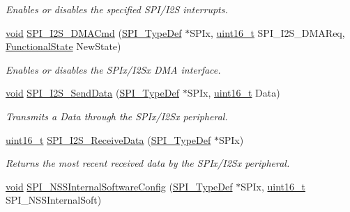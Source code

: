 \begin{DoxyCompactItemize}
\begin{DoxyCompactList}\small\item\em Enables or disables the specified S\+P\+I/\+I2S interrupts. \end{DoxyCompactList}\item 
\hyperlink{usb__devapi_8h_afabf60e7f57651d6d595a02c75f07cd0}{void} \hyperlink{group___s_p_i___private___functions_gabed5b91a8576e6d578f364cc0e807e4a}{S\+P\+I\+\_\+\+I2\+S\+\_\+\+D\+M\+A\+Cmd} (\hyperlink{struct_s_p_i___type_def}{S\+P\+I\+\_\+\+Type\+Def} $\ast$S\+P\+Ix, \hyperlink{_p_e___types_8h_a1f1825b69244eb3ad2c7165ddc99c956}{uint16\+\_\+t} S\+P\+I\+\_\+\+I2\+S\+\_\+\+D\+M\+A\+Req, \hyperlink{agilefox_2library_2inc_2stm32f10x__type_8h_ac9a7e9a35d2513ec15c3b537aaa4fba1}{Functional\+State} New\+State)
\begin{DoxyCompactList}\small\item\em Enables or disables the S\+P\+Ix/\+I2\+Sx D\+MA interface. \end{DoxyCompactList}\item 
\hyperlink{usb__devapi_8h_afabf60e7f57651d6d595a02c75f07cd0}{void} \hyperlink{group___s_p_i___private___functions_gad5af40bebe8dbe3fa8bd476489d7e3da}{S\+P\+I\+\_\+\+I2\+S\+\_\+\+Send\+Data} (\hyperlink{struct_s_p_i___type_def}{S\+P\+I\+\_\+\+Type\+Def} $\ast$S\+P\+Ix, \hyperlink{_p_e___types_8h_a1f1825b69244eb3ad2c7165ddc99c956}{uint16\+\_\+t} Data)
\begin{DoxyCompactList}\small\item\em Transmits a Data through the S\+P\+Ix/\+I2\+Sx peripheral. \end{DoxyCompactList}\item 
\hyperlink{_p_e___types_8h_a1f1825b69244eb3ad2c7165ddc99c956}{uint16\+\_\+t} \hyperlink{group___s_p_i___private___functions_gab77de76547f3bff403236b263b070a30}{S\+P\+I\+\_\+\+I2\+S\+\_\+\+Receive\+Data} (\hyperlink{struct_s_p_i___type_def}{S\+P\+I\+\_\+\+Type\+Def} $\ast$S\+P\+Ix)
\begin{DoxyCompactList}\small\item\em Returns the most recent received data by the S\+P\+Ix/\+I2\+Sx peripheral. \end{DoxyCompactList}\item 
\hyperlink{usb__devapi_8h_afabf60e7f57651d6d595a02c75f07cd0}{void} \hyperlink{group___s_p_i___private___functions_ga56fc508a482f032f9eb80e4c63184126}{S\+P\+I\+\_\+\+N\+S\+S\+Internal\+Software\+Config} (\hyperlink{struct_s_p_i___type_def}{S\+P\+I\+\_\+\+Type\+Def} $\ast$S\+P\+Ix, \hyperlink{_p_e___types_8h_a1f1825b69244eb3ad2c7165ddc99c956}{uint16\+\_\+t} S\+P\+I\+\_\+\+N\+S\+S\+Internal\+Soft)

\end{DoxyCompactItemize}
